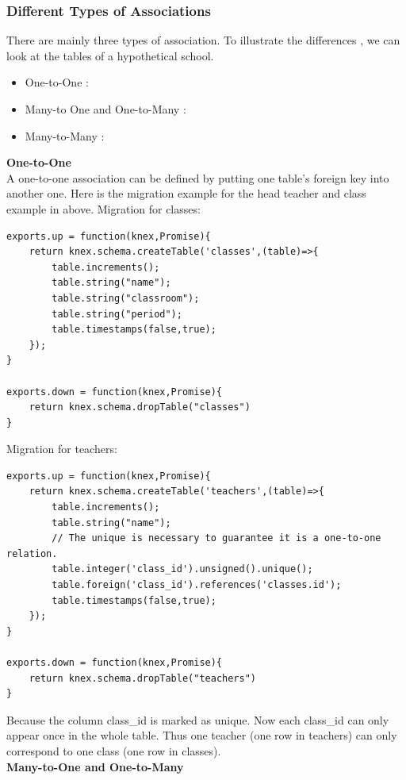 \documentclass[a4paper]{article}
\begin{document}
\subsubsection{Different Types of Associations}
There are mainly three types of association. To illustrate the differences , we can look at the tables of a hypothetical school.\\
\begin{itemize}
\item One-to-One : 
\item Many-to One and One-to-Many : 
\item Many-to-Many : 
\end{itemize}

\textbf{One-to-One}\\

A one-to-one association can be defined by putting one table’s foreign key into another one. Here is the migration example for the head teacher and class example in above. Migration for classes:
\begin{lstlisting}
exports.up = function(knex,Promise){
    return knex.schema.createTable('classes',(table)=>{
        table.increments();
        table.string("name");
        table.string("classroom");
        table.string("period");
        table.timestamps(false,true);
    });
}

exports.down = function(knex,Promise){
    return knex.schema.dropTable("classes")
}
\end{lstlisting}
Migration for teachers:
\begin{lstlisting}
exports.up = function(knex,Promise){
    return knex.schema.createTable('teachers',(table)=>{
        table.increments();
        table.string("name");
        // The unique is necessary to guarantee it is a one-to-one relation.
        table.integer('class_id').unsigned().unique();
        table.foreign('class_id').references('classes.id');
        table.timestamps(false,true);
    });
}

exports.down = function(knex,Promise){
    return knex.schema.dropTable("teachers")
}
\end{lstlisting}
Because the column class_id is marked as unique. Now each class_id can only appear once in the whole table. Thus one teacher (one row in teachers) can only correspond to one class (one row in classes).\\

\textbf{Many-to-One and One-to-Many}\\
\end{document}

